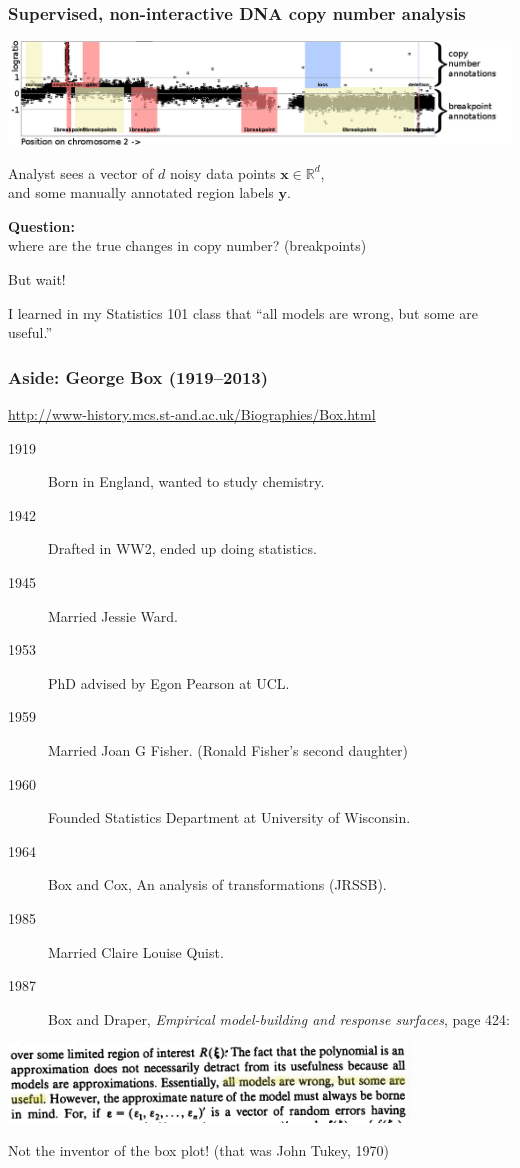 \documentclass{beamer}
\newcommand{\RR}{\mathbb R}
\begin{document}
\begin{frame}[fragile]
  \frametitle{Supervised, non-interactive DNA copy number analysis}

  \includegraphics[width=\textwidth]{regions-axes-full}

  Analyst sees a vector of $d$ noisy data points $\mathbf x\in\RR^d$,\\
  and some manually annotated region labels $\mathbf y$.

  \vskip 0.1in

  \textbf{Question:}\\
    where are the true changes in copy number? (breakpoints)

  \vskip 0.1in

  But wait!

  \vskip 0.1in
  
  I learned in my Statistics 101 class that ``all models are wrong,
  but some are useful.''

\end{frame}

\begin{frame}[fragile]
  \frametitle{Aside: George Box (1919--2013)}
  \small \url{http://www-history.mcs.st-and.ac.uk/Biographies/Box.html}
  \begin{description}
  \item[1919] Born in England, wanted to study chemistry.
  \item[1942] Drafted in WW2, ended up doing statistics.
  \item[1945] Married Jessie Ward.
  \item[1953] PhD advised by Egon Pearson at UCL.
  \item[1959] Married Joan G Fisher. (Ronald Fisher's second daughter)
  \item[1960] Founded Statistics Department at University of Wisconsin.
  \item[1964] Box and Cox, An analysis of transformations (JRSSB).
  \item[1985] Married Claire Louise Quist.
  \item[1987] Box and Draper, \textit{Empirical model-building and
      response surfaces}, page 424:
  \end{description}

  \includegraphics[width=0.8\textwidth]{Box-Draper-all-models-are-wrong-but-some-are-useful-hilite}

  Not the inventor of the box plot! (that was John Tukey, 1970)

\end{frame}
\end{document}
